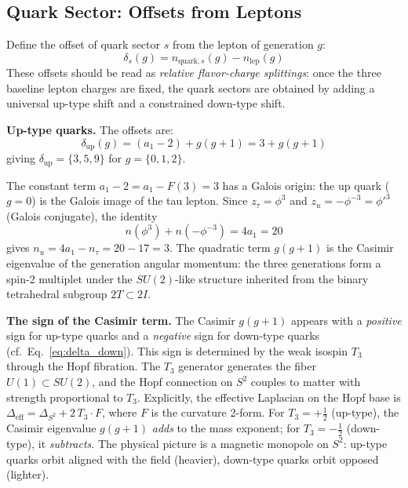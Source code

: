 \documentclass[12pt,a4paper]{article}
\theoremstyle{definition}
\begin{document}
\subsection{Quark Sector: Offsets from Leptons}

Define the offset of quark sector $s$ from the lepton of generation $g$:
\begin{equation}
\delta_s(g) = n_{\text{quark},s}(g) - n_{\text{lep}}(g)
\end{equation}
These offsets should be read as \emph{relative flavor-charge splittings}: once the three baseline lepton charges are fixed, the quark sectors are obtained by adding a universal up-type shift and a constrained down-type shift.

\textbf{Up-type quarks.} The offsets are:
\begin{equation}
\boxed{\delta_{\text{up}}(g) = (a_1 - 2) + g(g+1) = 3 + g(g+1)}
\label{eq:delta_up}
\end{equation}
giving $\delta_{\text{up}} = \{3, 5, 9\}$ for $g = \{0, 1, 2\}$.

The constant term $a_1 - 2 = a_1 - F(3) = 3$ has a Galois origin: the up quark ($g = 0$) is the Galois image of the tau lepton. Since $z_\tau = \phi^3$ and $z_u = -\phi^{-3} = \phi'^3$ (Galois conjugate), the identity
\begin{equation}
n(\phi^3) + n(-\phi^{-3}) = 4a_1 = 20
\end{equation}
gives $n_u = 4a_1 - n_\tau = 20 - 17 = 3$. The quadratic term $g(g+1)$ is the Casimir eigenvalue of the generation angular momentum: the three generations form a spin-2 multiplet under the $SU(2)$-like structure inherited from the binary tetrahedral subgroup $2T \subset 2I$.

\textbf{The sign of the Casimir term.} The Casimir $g(g+1)$ appears with a \emph{positive} sign for up-type quarks and a \emph{negative} sign for down-type quarks (cf.\ Eq.~\eqref{eq:delta_down}). This sign is determined by the weak isospin $T_3$ through the Hopf fibration. The $T_3$ generator generates the fiber $U(1) \subset SU(2)$, and the Hopf connection on $S^2$ couples to matter with strength proportional to $T_3$. Explicitly, the effective Laplacian on the Hopf base is $\Delta_{\text{eff}} = \Delta_{S^2} + 2\,T_3 \cdot F$, where $F$ is the curvature 2-form. For $T_3 = +\tfrac{1}{2}$ (up-type), the Casimir eigenvalue $g(g+1)$ \emph{adds} to the mass exponent; for $T_3 = -\tfrac{1}{2}$ (down-type), it \emph{subtracts}. The physical picture is a magnetic monopole on $S^2$: up-type quarks orbit aligned with the field (heavier), down-type quarks orbit opposed (lighter).
\end{document}
